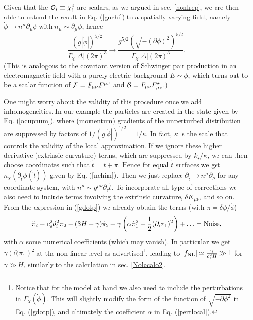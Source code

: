 \documentclass[11pt,amsmath,floats,floatfix,nofootinbib,secnumarabic, superscriptaddress, tightenlines]{revtex4}
\newcommand{\beq}{\begin{equation}}
\newcommand{\eeq}{\end{equation}}
\newcommand{\calo}{{\cal O}}
\begin{document}
{Given that the $\calo_i \equiv \chi_i^2$ are scalars, as we argued in sec. \ref{nonlrep}, we are then able to extend the result in Eq. (\ref{gnchi}) to a spatially varying field, namely $\dot\phi \to n^\mu \partial_\mu \phi$ with $n_\mu \sim \partial_\mu \phi$, hence
\beq
\label{gdotp}
\frac{(g |\dot{\phi}|)^{5/2}}{\Gamma_{\chi}|\Delta|(2\pi)^3} \to \frac{g^{5/2}\left( \sqrt{-(\partial\phi)^2}\right)^{5/2}}{\Gamma_{\chi}|\Delta|(2\pi)^3}.
\eeq
(This is analogous to the covariant version of Schwinger pair production in an electromagnetic field with a purely electric background  $E \sim \dot\phi$, which turns out to be a scalar function of ${\cal F} = F_{\mu\nu}F^{\mu\nu}$ and ${\cal B} = F_{\mu\nu} F^\star_{\mu\nu}$.) 

One might worry about the validity of this procedure once we add inhomogeneities. In our example the particles are created in the state given by Eq. (\ref{ocupnum}), where (momentum) gradients
 of the unperturbed distribution are suppressed by factors of $1/(g|\dot\phi|)^{1/2} = 1/\kappa$. In fact, $\kappa$ is the scale that controls the validity of the local approximation. If we ignore these higher derivative (extrinsic curvature) terms, which are suppressed by $k_\star/\kappa$, we can then choose coordinates such that $\tilde t = t+\pi$. Hence for equal $\tilde t$ surfaces we get $n_\chi\left(\partial_{\tilde t}\phi(\tilde t)\right)$ given by Eq. (\ref{nchim}). Then we just replace $\partial_{\tilde t} \to n^\mu \partial_\mu$ for any coordinate system, with $n^\mu \sim g^{\mu\nu}\partial_\nu \tilde t$. To incorporate all type of corrections we also need to include terms involving the extrinsic curvature, $\delta K_{\mu\nu}$, and so on.\\
 
From the expression in (\ref{gdotp}) we already obtain the terms (with $\pi = \delta\phi/\dot\phi$)
\beq\label{pertlocal}\ddot{\pi}_2 - c_s^2 \partial_i^2\pi_2+(3H+\gamma)\dot{\pi}_2+ \gamma \left(\alpha \dot{\pi}_1^2 -\frac{1}{2}(\partial_i \pi_1)^2\right)+\ldots ={\rm Noise},\eeq
with $\alpha$ some numerical coefficients (which may vanish). In particular we get $\gamma(\partial_i \pi_1)^2$ at the non-linear level as advertised\footnote{Notice that for the model at hand we also need to include the perturbations in $\Gamma_\chi (\dot\phi)$. This will slightly modify the form of the function of $\sqrt{-\partial\phi^2}$ in Eq. (\ref{gdotp}), and ultimately the coefficient $\alpha$ in Eq. (\ref{pertlocal}).}, leading to $|f_{\rm NL}| \simeq \frac{\gamma}{c_s^2H} \gg  1$ for $\gamma \gg H$, similarly to the calculation in sec. \ref{Nolocalo2}.\\

}
\end{document}
